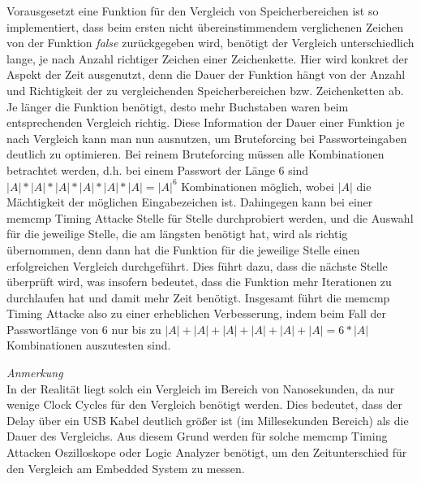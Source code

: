 \documentclass[a4paper,
DIV=13,
12pt,
BCOR=10mm,
department=FakIM,
oneside,
parskip=half,
automark,
listof=totocnumbered,
bibliography=totocnumbered,
acronym=totocnumbered
] {OTHRartcl}
\begin{document}
Vorausgesetzt eine Funktion für den Vergleich von Speicherbereichen ist so implementiert, dass beim ersten nicht übereinstimmendem verglichenen Zeichen von der Funktion \textit{false} zurückgegeben wird,
benötigt der Vergleich unterschiedlich lange, je nach Anzahl richtiger Zeichen einer Zeichenkette.
Hier wird konkret der Aspekt der Zeit ausgenutzt, denn die Dauer der Funktion hängt von der Anzahl und Richtigkeit der zu vergleichenden Speicherbereichen bzw. Zeichenketten ab.
Je länger die Funktion benötigt, desto mehr Buchstaben waren beim entsprechenden Vergleich richtig.
Diese Information der Dauer einer Funktion je nach Vergleich kann man nun ausnutzen, um Bruteforcing bei Passworteingaben deutlich zu optimieren.
Bei reinem Bruteforcing müssen alle Kombinationen betrachtet werden, d.h.
bei einem Passwort der Länge 6 sind $|A|*|A|*|A|*|A|*|A|*|A| = |A|^6$ Kombinationen möglich, wobei $|A|$ die Mächtigkeit der möglichen Eingabezeichen ist.
Dahingegen kann bei einer memcmp Timing Attacke Stelle für Stelle durchprobiert werden, und die Auswahl für die jeweilige Stelle, die am längsten benötigt hat,
wird als richtig übernommen, denn dann hat die Funktion für die jeweilige Stelle einen erfolgreichen Vergleich durchgeführt.
Dies führt dazu, dass die nächste Stelle überprüft wird, was insofern bedeutet, dass die Funktion mehr Iterationen zu durchlaufen hat und damit mehr Zeit benötigt.
Insgesamt führt die memcmp Timing Attacke also zu einer erheblichen Verbesserung, indem beim Fall der Passwortlänge von 6
nur bis zu $ |A|+|A|+|A|+|A|+|A|+|A| = 6 * |A| $ Kombinationen auszutesten sind. \cite{Hardware Hacking Handbook}

\textit{Anmerkung} \mbox{} \\
In der Realität liegt solch ein Vergleich im Bereich von Nanosekunden, da nur wenige Clock Cycles für den Vergleich benötigt werden.
Dies bedeutet, dass der Delay über ein USB Kabel deutlich größer ist (im Millesekunden Bereich) als die Dauer des Vergleichs.
Aus diesem Grund werden für solche memcmp Timing Attacken Oszilloskope oder Logic Analyzer benötigt, um den Zeitunterschied
für den Vergleich am Embedded System zu messen. \cite{Hardware Hacking Handbook}
\end{document}
